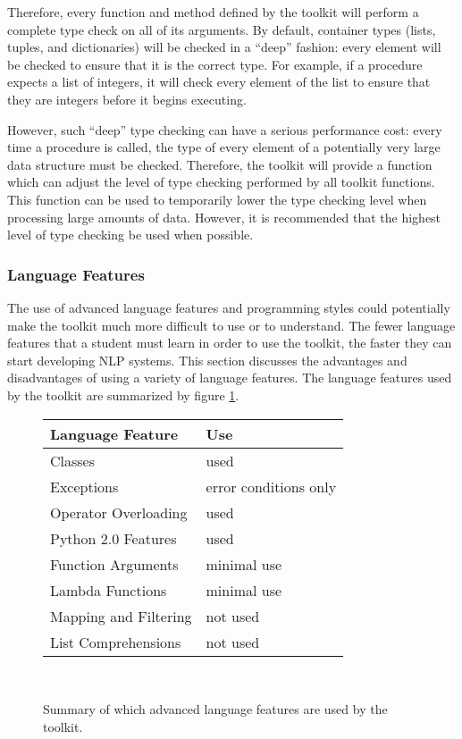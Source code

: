 \documentclass{article}
\begin{document}
Therefore, every function and method defined by the toolkit will
perform a complete type check on all of its arguments.  By default,
container types (lists, tuples, and dictionaries) will be checked in a 
``deep'' fashion: every element will be checked to ensure that it is
the correct type.  For example, if a procedure expects a list of
integers, it will check every element of the list to ensure that they
are integers before it begins executing.  

However, such ``deep'' type checking can have a serious performance
cost: every time a procedure is called, the type of every element of a
potentially very large data structure must be checked.  Therefore, the 
toolkit will provide a function which can adjust the level of type
checking performed by all toolkit functions.  This function can be
used to temporarily lower the type checking level when processing
large amounts of data.  However, it is recommended that the highest
level of type checking be used when possible.

\subsubsection{Language Features}

The use of advanced language features and programming styles could
potentially make the toolkit much more difficult to use or to
understand.  The fewer language features that a student must learn in
order to use the toolkit, the faster they can start developing NLP
systems.  This section discusses the advantages and disadvantages of
using a variety of language features.  The language features used by
the toolkit are summarized by figure \ref{fig:feature}.

\begin{figure}
\begin{centering}
\begin{tabular}{|l|l|}
\hline
\textbf{Language Feature} & \textbf{Use} \\
\hline
Classes & used \\
Exceptions & error conditions only \\
Operator Overloading & used \\
Python 2.0 Features & used \\
Function Arguments & minimal use \\
Lambda Functions & minimal use \\
Mapping and Filtering & not used \\
List Comprehensions & not used \\
\hline
\end{tabular}\\
\end{centering}
\caption{Summary of which advanced language features are used by the
toolkit.}
\label{fig:feature}
\end{figure}
\end{document}
